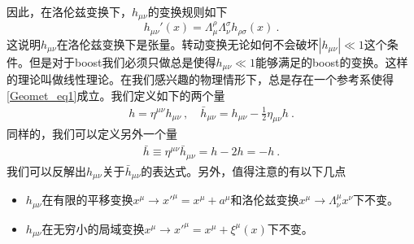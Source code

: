 因此，在洛伦兹变换下，$h_{\mu\nu}$的变换规则如下
\begin{equation}
h_{\mu\nu}'(x) = \Lambda^\rho_\mu\Lambda^\sigma_\nu h_{\rho\sigma} (x) ~. 
\end{equation}
这说明$h_{\mu\nu}$在洛伦兹变换下是张量。转动变换无论如何不会破坏$|h_{\mu\nu}|\ll 1$这个条件。但是对于boost我们必须只做总是使得$h_{\mu\nu}\ll 1$能够满足的boost的变换。这样的理论叫做线性理论。在我们感兴趣的物理情形下，总是存在一个参考系使得\autoref{Geomet_eq1}成立。我们定义如下的两个量 
\begin{align}
h = \eta^{\mu\nu} h_{\mu\nu} ~, \quad \bar h_{\mu\nu} = h_{\mu\nu} - \frac{1}{2} \eta_{\mu\nu} h~.
\end{align}
同样的，我们可以定义另外一个量
\begin{align}
\bar h \equiv \eta^{\mu\nu} \bar h_{\mu\nu} = h - 2 h = -h~.
\end{align}
我们可以反解出$h_{\mu\nu}$关于$\bar h_{\mu\nu}$的表达式。另外，值得注意的有以下几点
\begin{itemize}
\item $h_{\mu\nu}$在有限的平移变换$x^\mu\rightarrow x'^\mu = x^\mu + a^\mu$和洛伦兹变换$x^\mu\rightarrow \Lambda^\mu_\nu x^\nu$下不变。
\item $h_{\mu\nu}$在无穷小的局域变换$x^\mu \rightarrow x'^\mu = x^\mu + \xi^\mu (x)$下不变。
\end{itemize}







